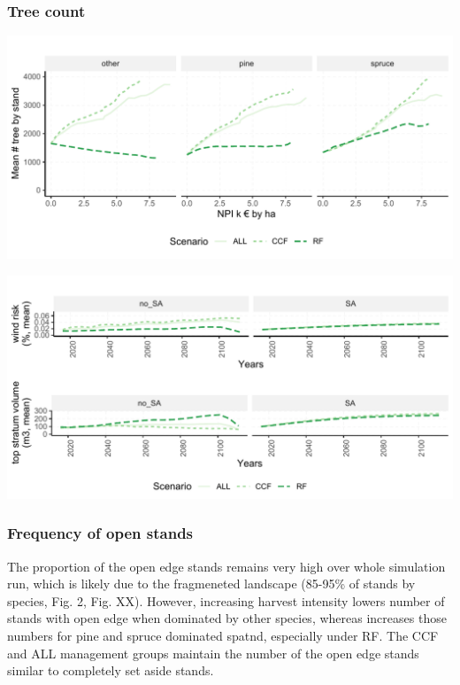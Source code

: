 \documentclass[]{elsarticle} %
\makeatletter
\def\maxwidth{\ifdim\Gin@nat@width>\linewidth\linewidth
\else\Gin@nat@width\fi}
\let\Oldincludegraphics\includegraphics
\renewcommand{\includegraphics}[1]{\Oldincludegraphics[width=\maxwidth]{#1}}
\makeatother
\begin{document}
\hypertarget{tree-count}{%
\subsubsection{Tree count}\label{tree-count}}

\includegraphics{test_manus_files/figure-latex/mean_tree_n-1.pdf}

\includegraphics{test_manus_files/figure-latex/wind_risk_SA-1.pdf}

\hypertarget{frequency-of-open-stands}{%
\subsubsection{Frequency of open stands}\label{frequency-of-open-stands}}

The proportion of the open edge stands remains very high over whole simulation run, which is likely due to the fragmeneted landscape (85-95\% of stands by species, Fig. 2, Fig. XX). However, increasing harvest intensity lowers number of stands with open edge when dominated by other species, whereas increases those numbers for pine and spruce dominated spatnd, especially under RF. The CCF and ALL management groups maintain the number of the open edge stands similar to completely set aside stands.
\end{document}
